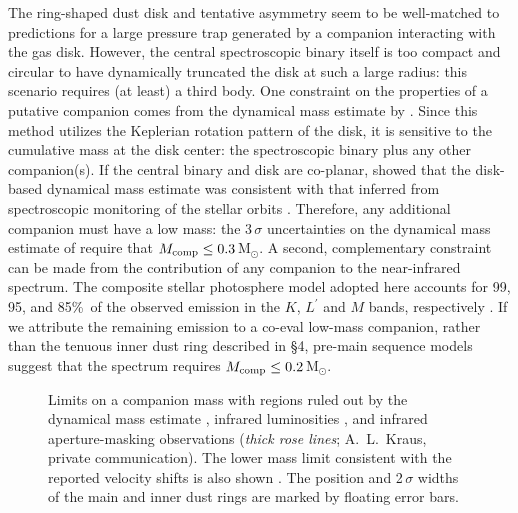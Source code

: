 {The ring-shaped dust disk and tentative asymmetry seem to be well-matched to 
predictions for a large pressure trap generated by a companion interacting with 
the gas disk.  However, the central spectroscopic binary itself is too compact 
and circular to have dynamically truncated the disk at such a large radius: this
scenario requires (at least) a third body.  One constraint on the properties of 
a putative companion comes from the dynamical mass estimate by 
\citet{rosenfeld12}.  Since this method utilizes the Keplerian rotation pattern
of the disk, it is sensitive to the cumulative mass at the disk center: the 
spectroscopic binary plus any other companion(s).  If the central binary and 
disk are co-planar, \citet{rosenfeld12} showed that the disk-based dynamical 
mass estimate was consistent with that inferred from spectroscopic monitoring of
the stellar orbits \citep{stempels13}.  Therefore, any additional companion must
have a low mass: the 3\,$\sigma$ uncertainties on the dynamical mass estimate of
\citet{rosenfeld12} require that $M_{\rm{comp}} \le 0.3$\,M$_\odot$.  A second,
complementary constraint can be made from the contribution of any companion to 
the near-infrared spectrum.  The composite stellar photosphere model adopted 
here accounts for 99, 95, and 85\%\ of the observed emission in the $K$, 
$L^{\prime}$ and $M$ bands, respectively \citep{jensen97,hutchinson90,
skrutskie06}.  If we attribute the remaining emission to a co-eval low-mass 
companion, rather than the tenuous inner dust ring described in \S 4, pre-main 
sequence models \citep[e.g.][]{baraffe98} suggest that the spectrum requires
$M_{\rm comp} \le 0.2$\,M$_\odot$.

\begin{figure}[t!]
\caption{Limits on a companion mass with regions ruled out by the dynamical 
mass estimate \citep[{\it orange dots};][]{rosenfeld12}, infrared luminosities 
\citep[{\it solid blue};][]{jensen97,hutchinson90,skrutskie06}, and infrared 
aperture-masking observations ({\it thick rose lines}; A.~L.~Kraus, private 
communication).  The lower mass limit consistent with the reported velocity 
shifts is also shown \citep[{\it gray line};][]{quast00,donati11,rodriguez10}. 
The position and 2\,$\sigma$ widths of the main and inner dust rings are marked 
by floating error bars.
\label{fig:companion}}
\end{figure}

}
